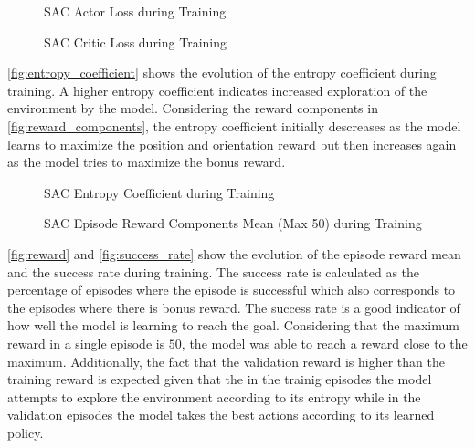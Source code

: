 \begin{figure}[H]%
    \centering
    {\fontsize{8}{11}\selectfont}
    \caption{SAC Actor Loss during Training}
    \label{fig:actor_loss}
\end{figure}

\begin{figure}[H]%
    \centering
    {\fontsize{8}{11}\selectfont}
    \caption{SAC Critic Loss during Training}
    \label{fig:critic_loss}
\end{figure}

\autoref{fig:entropy_coefficient} shows the evolution of the entropy coefficient during training. A higher entropy coefficient indicates increased exploration of the environment by the model. Considering the reward components in \autoref{fig:reward_components}, the entropy coefficient initially descreases as the model learns to maximize the position and orientation reward but then increases again as the model tries to maximize the bonus reward. 

\begin{figure}[H]%
    \centering
    {\fontsize{8}{11}\selectfont}
    \caption{SAC Entropy Coefficient during Training}
    \label{fig:entropy_coefficient}
\end{figure}

\begin{figure}[H]%
    \centering
    {\fontsize{8}{11}\selectfont}
    \caption{SAC Episode Reward Components Mean (Max 50) during Training}
    \label{fig:reward_components}
\end{figure}

\autoref{fig:reward} and \autoref{fig:success_rate} show the evolution of the episode reward mean and the success rate during training. The success rate is calculated as the percentage of episodes where the episode is successful which also corresponds to the episodes where there is bonus reward. The success rate is a good indicator of how well the model is learning to reach the goal. Considering that the maximum reward in a single episode is $50$, the model was able to reach a reward close to the maximum. Additionally, the fact that the validation reward is higher than the training reward is expected given that the in the trainig episodes the model attempts to explore the environment according to its entropy while in the validation episodes the model takes the best actions according to its learned policy.

